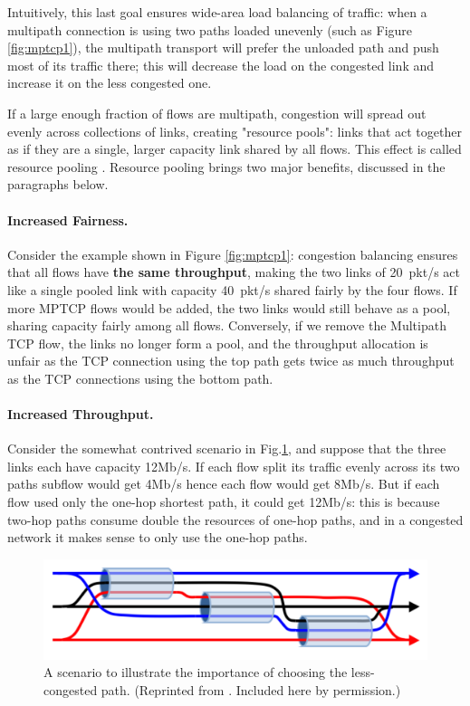 Intuitively, this last goal ensures wide-area load balancing of traffic: 
when a multipath connection is using two paths loaded unevenly (such as 
Figure \ref{fig:mptcp1}), the multipath transport will prefer the unloaded path
and push most of its traffic there; this will decrease the load on the 
congested link and increase it on the less congested one. 

If a large enough fraction of flows are multipath, congestion will spread 
out evenly across collections of links, creating "resource pools": links 
that act together as if they are a single, larger capacity link shared by 
all flows. This effect is called resource pooling \cite{pooling}.
Resource pooling brings two major benefits, discussed in the paragraphs below.

\paragraph{Increased Fairness.} 
Consider the example shown in Figure \ref{fig:mptcp1}: congestion
balancing ensures that all flows have \textbf{the same throughput}, making
the two links of 20~pkt/s act like a single pooled link with capacity 40~pkt/s 
shared fairly by the four flows. If more MPTCP flows would be added, the two links would still behave as a pool,
sharing capacity fairly among all flows. 
Conversely, if we remove the Multipath TCP flow, the links no longer form a pool, and the throughput allocation
is unfair as the TCP connection using the top path gets twice as much throughput as the TCP connections using the bottom path.


\paragraph{Increased Throughput.}
Consider the somewhat contrived scenario in Fig.\ref{fig:klingon},
and suppose that the three links each have capacity 12Mb/s.
If each flow split its traffic evenly
across its two paths subflow would get 4Mb/s 
hence each flow would get 8Mb/s. But if each flow used only 
the one-hop shortest path, it could get 12Mb/s: this is because
two-hop paths consume double the resources of one-hop paths,
and in a congested network it makes sense to only use the one-hop paths.

\begin{figure}[tb]
\centering
\includegraphics*[width=0.8\columnwidth]{figures/3pipes}
\caption{A scenario to illustrate the importance of choosing the
  less-congested path. (Reprinted from \cite{mptcp-cc}. Included here
  by permission.)}
\label{fig:klingon}
\end{figure}

